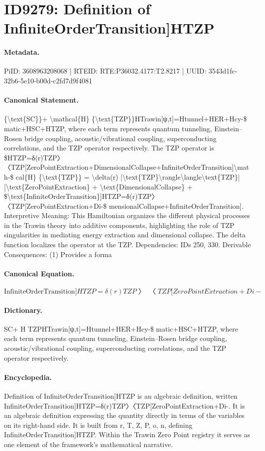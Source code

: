 \section*{ID9279: Definition of InfiniteOrderTransition]HTZP}
\paragraph{Metadata.}
PiID: 3608963208068 | RTEID: RTE:P36032.4177:T2.8217 | UUID: 3543d1fc-32b6-5e10-b00d-c2fd7d9f4081

\paragraph{Canonical Statement.}
\{\textbackslash{}text\{SC\}\}+ \textbackslash{}mathcal\{H\} \{\textbackslash{}text\{TZP\}\}HTrawin[ψ,t]=Htunnel+HER+Hcy-\$ matic+HSC+HTZP, where each term represents quantum tunneling, Einstein–Rosen bridge coupling, acoustic/vibrational coupling, superconducting correlations, and the TZP operator respectively. The TZP operator is \$HTZP=δ(r)TZP〉〈TZP[ZeroPointExtraction+DimensionalCollapse+InfiniteOrderTransition]\textbackslash{}math-\$ cal\{H\} \{\textbackslash{}text\{TZP\}\} = \textbackslash{}delta(r) |\textbackslash{}text\{TZP\}\textbackslash{}rangle\textbackslash{}langle\textbackslash{}text\{TZP\}| [\textbackslash{}text\{ZeroPointExtraction\} + \textbackslash{}text\{DimensionalCollapse\} + \$\textbackslash{}text\{InfiniteOrderTransition\}]HTZP=δ(r)TZP〉〈TZP[ZeroPointExtraction+Di-\$ mensionalCollapse+InfiniteOrderTransition]. Interpretive Meaning: This Hamiltonian organizes the different physical processes in the Trawin theory into additive components, highlighting the role of TZP singularities in mediating energy extraction and dimensional collapse. The delta function localizes the operator at the TZP. Dependencies: IDs 250, 330. Derivable Consequences: (1) Provides a forma

\paragraph{Canonical Equation.}
\[
\text{InfiniteOrderTransition}]HTZP=δ(r)TZP〉〈TZP[ZeroPointExtraction+Di-
\]

\paragraph{Dictionary.}
SC+ H TZPHTrawin[ψ,t]=Htunnel+HER+Hcy-\$ matic+HSC+HTZP, where each term represents quantum tunneling, Einstein–Rosen bridge coupling, acoustic/vibrational coupling, superconducting correlations, and the TZP operator respectively.

\paragraph{Encyclopedia.}
Definition of InfiniteOrderTransition]HTZP is an algebraic definition, written InfiniteOrderTransition]HTZP=δ(r)TZP〉〈TZP[ZeroPointExtraction+Di-. It is an algebraic definition expressing the quantity directly in terms of the variables on its right-hand side. It is built from r, T, Z, P, o, n, defining InfiniteOrderTransition]HTZP. Within the Trawin Zero Point registry it serves as one element of the framework's mathematical narrative.
